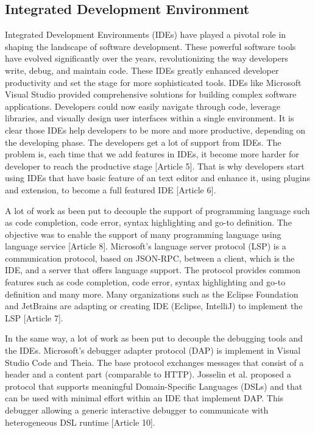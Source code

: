  \subsection{Integrated Development Environment}
 
Integrated Development Environments (IDEs) have played a pivotal role in shaping the landscape of software development. These powerful software tools have evolved significantly over the years, revolutionizing the way developers write, debug, and maintain code. These IDEs greatly enhanced developer productivity and set the stage for more sophisticated tools. IDEs like Microsoft Visual Studio provided comprehensive solutions for building complex software applications. Developers could now easily navigate through code, leverage libraries, and visually design user interfaces within a single environment. It is clear those IDEs help developers to be more and more productive, depending on the developing phase. The developers get a lot of support from IDEs. The problem is, each time that we add features in IDEs, it become more harder for developer to reach the  productive stage [Article 5]. That is why developers start using IDEs that have basic feature of an text editor and enhance it, using plugins and extension, to become a full featured IDE [Article 6]. 


A lot of work as been put to decouple the support of programming language such as code completion, code error, syntax highlighting and go-to definition. The objective was to enable the support of many programming language using language service [Article 8]. Microsoft's language server protocol (LSP) is a communication protocol, based on JSON-RPC, between a client, which is the IDE, and a server that offers language support. The protocol provides common features such as code completion, code error, syntax highlighting and go-to definition and many more. Many organizations such as the Eclipse Foundation and JetBrains are adapting or creating IDE (Eclipse, IntelliJ) to implement the LSP [Article 7]. 

In the same way, a lot of work as been put to decouple the debugging tools and the IDEs. Microsoft's debugger adapter protocol (DAP) is implement in Visual Studio Code and Theia. The base protocol exchanges messages that consist of a header and a content part (comparable to HTTP). Josselin et al. proposed a protocol that supports meaningful Domain-Specific Languages (DSLs) and that can be used with minimal effort within an IDE that implement DAP. This debugger allowing a generic interactive debugger to communicate with heterogeneous DSL runtime [Article 10]. 

